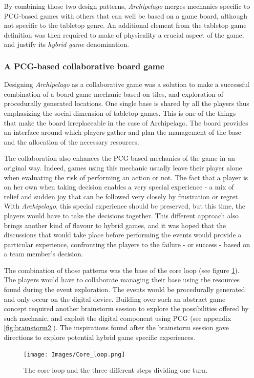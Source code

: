 By combining those two design patterns, \textit{Archipelago} merges mechanics specific to PCG-based games with others that can well be based on a game board, although not specific to the tabletop genre. An additional element from the tabletop game definition was then required to make of physicality a crucial aspect of the game, and justify its \textit{hybrid game} denomination.

\subsubsection{A PCG-based collaborative board game}

Designing \textit{Archipelago} as a collaborative game was a solution to make a successful combination of a board game mechanic based on tiles, and exploration of procedurally generated locations. One single base is shared by all the players thus emphasizing the social dimension of tabletop games. This is one of the things that make the board irreplaceable in the case of Archipelago. The board provides an interface around which players gather and plan the management of the base and the allocation of the necessary resources.

The collaboration also enhances the PCG-based mechanics of the game in an original way. Indeed, games using this mechanic usually leave their player alone when evaluating the risk of performing an action or not. The fact that a player is on her own when taking decision enables a very special experience - a mix of relief and sudden joy that can be followed very closely by frustration or regret. With \textit{Archipelago}, this special experience should be preserved, but this time, the players would have to take the decisions together. This different approach also brings another kind of flavour to hybrid games, and it was hoped that the discussions that would take place before performing the events would provide a particular experience, confronting the players to the failure - or success - based on a team member's decision.

The combination of those patterns was the base of the core loop (see figure \ref{fig:loop}). The players would have to collaborate managing their base using the resources found during the event exploration. The events would be procedurally generated and only occur on the digital device. Building over such an abstract game concept required another brainstorm session to explore the possibilities offered by such mechanic, and exploit the digital component using PCG (see appendix \ref{fig:brainstorm2}). The inspirations found after the brainstorm session gave directions to explore potential hybrid game specific experiences.
\begin{figure}[!ht]
    \centering
    \texttt{[image: Images/Core\_loop.png]}
    \caption{The core loop and the three different steps dividing one turn.}
    \label{fig:loop}
\end{figure}
